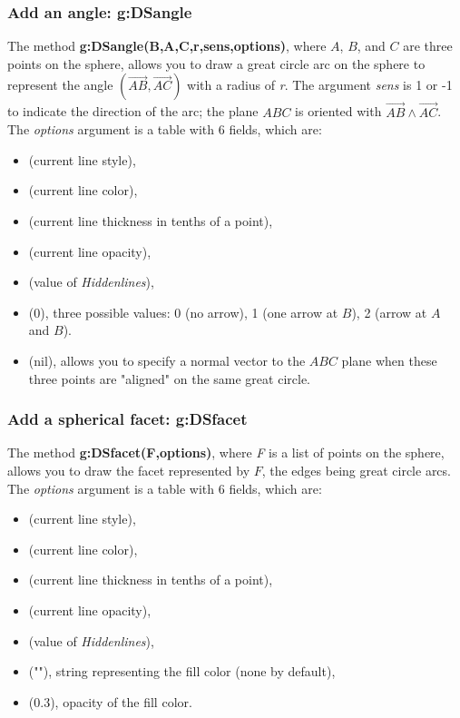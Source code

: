 \subsubsection{Add an angle: g:DSangle}

The method \textbf{g:DSangle(B,A,C,r,sens,options)}, where $A$, $B$, and $C$ are three points on the sphere, allows you to draw a great circle arc on the sphere to represent the angle $(\vec{AB},\vec{AC})$ with a radius of \emph{r}. The argument \emph{sens} is 1 or -1 to indicate the direction of the arc; the plane $ABC$ is oriented with $\vec{AB}\wedge\vec{AC}$. The \emph{options} argument is a table with 6 fields, which are:
\begin{itemize}
    \item {} (current line style),
    \item {} (current line color),
    \item {} (current line thickness in tenths of a point),
    \item {} (current line opacity),
    \item {} (value of \emph{Hiddenlines}),
    \item {} (0), three possible values: 0 (no arrow), 1 (one arrow at $B$), 2 (arrow at $A$ and $B$).
    \item {} (nil), allows you to specify a normal vector to the $ABC$ plane when these three points are "aligned" on the same great circle. \end{itemize}

\subsubsection{Add a spherical facet: g:DSfacet}

The method \textbf{g:DSfacet(F,options)}, where \emph{F} is a list of points on the sphere, allows you to draw the facet represented by $F$, the edges being great circle arcs. The \emph{options} argument is a table with 6 fields, which are:
\begin{itemize}
    \item {} (current line style),
    \item {} (current line color),
    \item {} (current line thickness in tenths of a point),
    \item {} (current line opacity),
    \item {} (value of \emph{Hiddenlines}),
    \item {} (""), string representing the fill color (none by default),
    \item {} (0.3), opacity of the fill color. \end{itemize}

